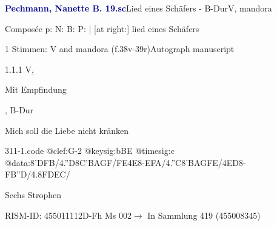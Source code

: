 \documentclass[twocolumn, 12pt]{book}
\begin{document}
\par \vspace{16pt} \textcolor{darkblue}{\textbf{Pechmann, Nanette B.  19.sc}}\hfillplus{\textbf{[311]}}\newline Lied eines Schäfers - B-Dur\newline V, mandora
\par \begin{itshape}[heading, f.38v:] Composée p: N: B: P: | [at right:] lied eines Schäfers\end{itshape} 
\par \textcolor{darkblue}{}  1 Stimmen: V and mandora  (f.38v-39r)\newline Autograph manuscript
\par 1.1.1  V, \begin{itshape}Mit Empfindung\end{itshape}, B-Dur\newline \begin{footnotesize} Mich soll die Liebe nicht kränken \end{footnotesize}  
\begin{filecontents*}{311-1.code}
@clef:G-2
@keysig:bBE
@timesig:c
@data:8'DFB/4.''D8C'BAGF/{FE}4E8-EFA/4.''C8'BAGFE/4ED8-FB''D/4.8FDEC/
\end{filecontents*}
\newline %
\par Sechs Strophen
\par RISM-ID: 455011112\newline D-Fh  Ms 002\newline $\rightarrow$ In Sammlung 419 (455008345)
      
\end{document}

